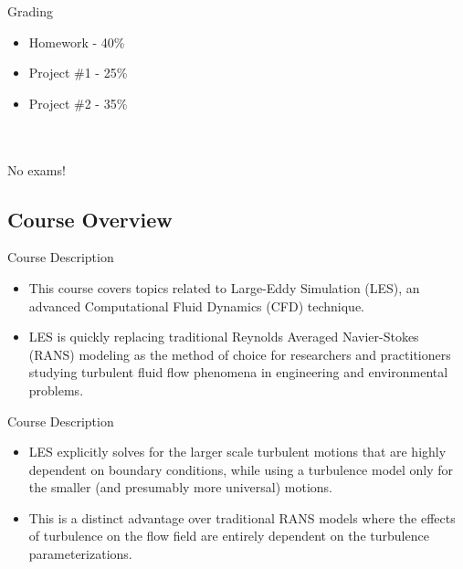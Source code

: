 
\begin{frame}{Grading}
\begin{itemize}
\item Homework - 40\%
\item Project \#1 - 25\%
\item Project \#2 - 35\%
\end{itemize}
~\\~\\
No exams!
\end{frame}

\subsection{Course Overview}
\begin{frame}{Course Description}
\begin{itemize}
\item This course covers topics related to Large-Eddy Simulation (LES), an advanced Computational Fluid Dynamics (CFD) technique. 
\item LES is quickly replacing traditional Reynolds Averaged Navier-Stokes (RANS) modeling as the method of choice for researchers and practitioners studying turbulent fluid flow phenomena in engineering and environmental problems.
\end{itemize}

\end{frame}


\begin{frame}{Course Description}
\begin{itemize}
\item LES explicitly solves for the larger scale turbulent motions that are highly dependent on boundary conditions, while using a turbulence model only for the smaller (and presumably more universal) motions. 
\item This is a distinct advantage over traditional RANS models where the effects of turbulence on the flow field are entirely dependent on the turbulence parameterizations.
\end{itemize}
\end{frame}


